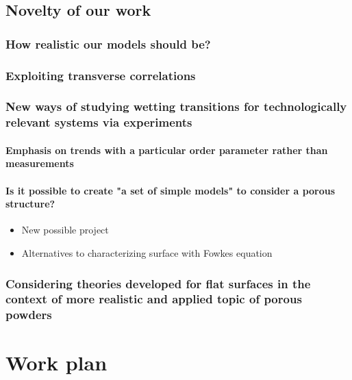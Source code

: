 \documentclass[a4paper,12pt,single,pdftex]{scrartcl}
\begin{document}
{\label{ID_1979164963}\subsection{Novelty of our work}

\label{ID_1997632539}\subsubsection{How realistic our models should be?}

\label{ID_625214648}\subsubsection{Exploiting transverse correlations}

\label{ID_1607535616}\subsubsection{New ways of studying wetting transitions for technologically relevant systems via experiments}

\label{ID_825518109}\paragraph{Emphasis on trends with a particular order parameter rather than measurements}

\label{ID_1028951925}\paragraph{Is it possible to create "a set of simple models" to consider a porous structure?}

\begin{itemize}
\label{ID_1602351942}\item New possible project
\label{ID_714004449}\item Alternatives to characterizing surface with Fowkes equation
\end{itemize}
\label{ID_1602351942}\label{ID_714004449}\label{ID_30899692}\subsubsection{Considering theories developed for flat surfaces in the context of more realistic and applied topic of porous powders}

\label{ID_1615838882}\section{Work plan}

}
\end{document}
